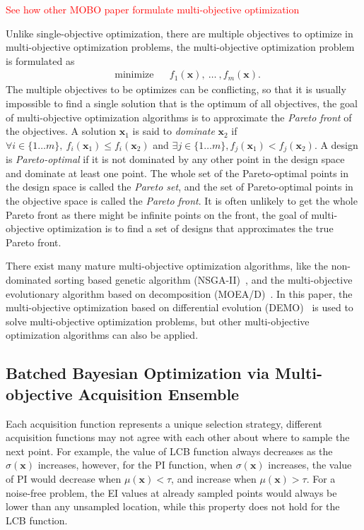 \textcolor{red}{See how other MOBO paper formulate multi-objective optimization}

Unlike single-objective optimization, there are multiple objectives to optimize in multi-objective optimization problems\cite{MO_overview}, the multi-objective optimization problem is formulated as
\begin{equation}
    \label{eq:MOFormulation}
    \begin{aligned}
        & \text{minimize} & & f_1(\bm{x}),~\dots~,f_m(\bm{x}).
    \end{aligned}
\end{equation}
The multiple objectives to be optimizes can be conflicting, so that it is usually impossible to find a single solution that is the optimum of all objectives, the goal of multi-objective optimization algorithms is to approximate the \emph{Pareto front} of the objectives. A solution $\bm{x}_1$ is said to \emph{dominate} $\bm{x}_2$ if $\forall i \in \{1\dots m\},~f_i(\bm{x}_1) \le f_i(\bm{x}_2)$ and $\exists j \in \{1\dots m\}, f_j(\bm{x}_1) < f_j(\bm{x}_2)$. A design is \emph{Pareto-optimal} if it is not dominated by any other point in the design space and dominate at least one point. The whole set of the Pareto-optimal points in the design space is called the \emph{Pareto set}, and the set of Pareto-optimal points in the objective space is called the \emph{Pareto front}. It is often unlikely to get the whole Pareto front as there might be infinite points on the front, the goal of multi-objective optimization is to find a set of designs that approximates the true Pareto front.

There exist many mature multi-objective optimization algorithms, like the non-dominated sorting based genetic algorithm (NSGA-II)~\cite{nsgaii}, and the multi-objective evolutionary algorithm based on decomposition (MOEA/D)~\cite{moead}. In this paper, the multi-objective optimization based on differential evolution (DEMO)~\cite{demo} is used to solve multi-objective optimization problems, but other multi-objective optimization algorithms can also be applied.

\subsection{Batched Bayesian Optimization via Multi-objective Acquisition Ensemble}

Each acquisition function represents a unique selection strategy, different acquisition functions may not agree with each other about where to sample the next point. For example, the value of LCB function always decreases as the $\sigma(\bm{x})$ increases, however, for the PI function, when $\sigma(\bm{x})$ increases, the value of PI would decrease when $\mu(\bm{x}) < \tau$, and increase when $\mu(\bm{x}) > \tau$. For a noise-free problem, the EI values at already sampled points would always be lower than any unsampled location, while this property does not hold for the LCB function.


